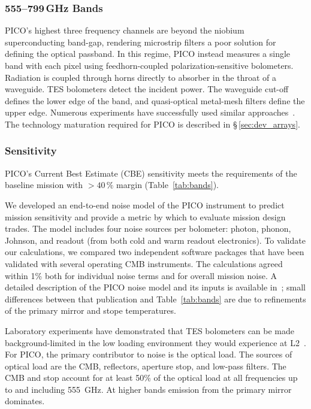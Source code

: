 \subsubsection{555--799\,GHz Bands}
\label{sec:high_freq_det} %

PICO's highest three frequency channels are beyond the niobium superconducting band-gap, rendering microstrip filters a poor solution for defining the optical passband. In this regime, PICO instead measures a single band with each pixel using feedhorn-coupled polarization-sensitive bolometers. Radiation is coupled through horns directly to absorber in the throat of a waveguide. TES bolometers detect the incident power.  The waveguide cut-off defines the lower edge of the band, and quasi-optical metal-mesh filters define the upper edge. Numerous experiments have successfully used similar approaches~\citep{Shirokoff2011,Bleem2012,Turner2001}. The technology maturation required for PICO is described in \S\,\ref{sec:dev_arrays}.



\subsubsection{Sensitivity}
\label{sec:sensitivity} %

PICO's Current Best Estimate (CBE) sensitivity meets the requirements of the baseline mission with \hbox{$>40\,\%$} margin (Table~\ref{tab:bands}).

We developed an end-to-end noise model of the PICO instrument to predict mission sensitivity and provide a metric by which to evaluate mission design trades. The model includes four noise sources per bolometer: photon, phonon, Johnson, and readout (from both cold and warm readout electronics). To validate our calculations, we compared two independent software packages that have been validated with several operating CMB instruments. The calculations agreed within 1\% both for individual noise terms and for overall mission noise. A detailed description of the PICO noise model and its inputs is available in~\citet{Young2018}; small differences between that publication and Table~\ref{tab:bands} are due to refinements of the primary mirror and stope temperatures.


Laboratory experiments have demonstrated that TES bolometers can be made background-limited in the low loading environment they would experience at L2~\citep{Beyer2012}. For PICO, the primary contributor to noise is the optical load. The sources of optical load are the CMB, reflectors, aperture stop, and low-pass filters. The CMB and stop account for at least 50\% of the optical load at all frequencies up to and including 555~GHz. At higher bands emission from the primary mirror dominates.

